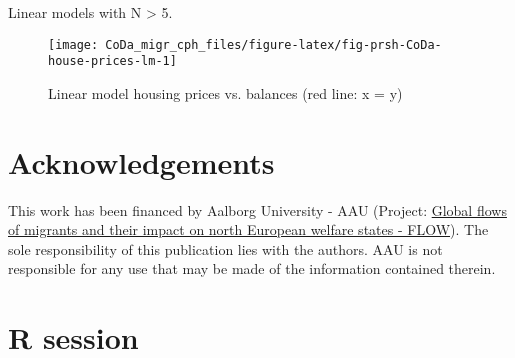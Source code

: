 \documentclass[
  12pt,
]{article}
\begin{document}
Linear models with N \textgreater{} 5.

\begin{figure}[H]

{\centering \texttt{[image: CoDa\_migr\_cph\_files/figure-latex/fig-prsh-CoDa-house-prices-lm-1]} 

}

\caption{Linear model housing prices vs. balances (red line: x = y)}\label{fig:fig-prsh-CoDa-house-prices-lm}
\end{figure}

\hypertarget{acknowledgements}{%
\section*{Acknowledgements}\label{acknowledgements}}

This work has been financed by Aalborg University - AAU (Project: \href{https://www.flow.aau.dk/}{Global flows of migrants and their impact on north European welfare states - FLOW}). The sole responsibility of this publication lies with the authors. AAU is not responsible for any use that may be made of the information contained therein.

\hypertarget{r-session}{%
\section*{R session}\label{r-session}}
\end{document}
